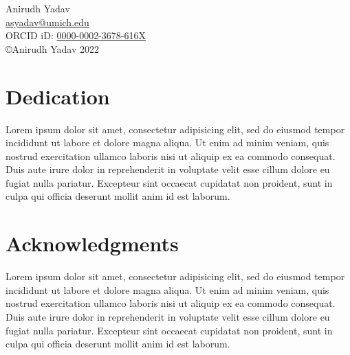 \begin{center}
\begin{onehalfspacing}
  Anirudh Yadav \\
  \href{mailto:asyadav@umich.edu}{\color{black}asyadav@umich.edu} \\
  ORCID iD: \href{http://orcid.org/0000-0002-3678-616X}{\color{black}0000-0002-3678-616X}\\
  \vspace{0.3in}
  \copyright\;Anirudh Yadav 2022
\end{onehalfspacing}
\end{center}

\vfill
\hspace{0pt}

\clearpage

\listoftodos

\setcounter{page}{2}

\chapter{Dedication}
\begin{onehalfspace}
Lorem ipsum dolor sit amet, consectetur adipisicing elit, sed do eiusmod
tempor incididunt ut labore et dolore magna aliqua. Ut enim ad minim veniam,
quis nostrud exercitation ullamco laboris nisi ut aliquip ex ea commodo
consequat. Duis aute irure dolor in reprehenderit in voluptate velit esse
cillum dolore eu fugiat nulla pariatur. Excepteur sint occaecat cupidatat non
proident, sunt in culpa qui officia deserunt mollit anim id est laborum.
\end{onehalfspace}

\chapter{Acknowledgments}
\begin{onehalfspace}
Lorem ipsum dolor sit amet, consectetur adipisicing elit, sed do eiusmod
tempor incididunt ut labore et dolore magna aliqua. Ut enim ad minim veniam,
quis nostrud exercitation ullamco laboris nisi ut aliquip ex ea commodo
consequat. Duis aute irure dolor in reprehenderit in voluptate velit esse
cillum dolore eu fugiat nulla pariatur. Excepteur sint occaecat cupidatat non
proident, sunt in culpa qui officia deserunt mollit anim id est laborum.
\end{onehalfspace}

